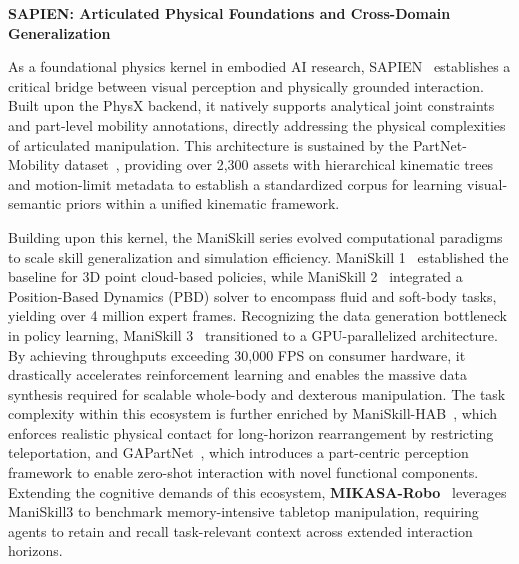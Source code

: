 \documentclass[acmsmall,screen,review,anonymous]{acmart}
\begin{document}
\textbf{SAPIEN\@: Articulated Physical Foundations and Cross-Domain Generalization}

As a foundational physics kernel in embodied AI research, SAPIEN~\cite{xiang2020sapien} establishes a critical bridge between visual perception and physically grounded interaction. 
Built upon the PhysX backend, it natively supports analytical joint constraints and part-level mobility annotations, directly addressing the physical complexities of articulated manipulation. 
This architecture is sustained by the PartNet-Mobility dataset~\cite{xiang2020sapien}, providing over 2,300 assets with hierarchical kinematic trees and motion-limit metadata to establish a standardized corpus for learning visual-semantic priors within a unified kinematic framework.

Building upon this kernel, the ManiSkill series evolved computational paradigms to scale skill generalization and simulation efficiency. ManiSkill 1~\cite{mu2021maniskill} established the baseline for 3D point cloud-based policies, while ManiSkill 2~\cite{gu2023maniskill2} integrated a Position-Based Dynamics (PBD) solver to encompass fluid and soft-body tasks, yielding over 4 million expert frames. Recognizing the data generation bottleneck in policy learning, ManiSkill 3~\cite{tao2025maniskill3} transitioned to a GPU-parallelized architecture. By achieving throughputs exceeding 30,000 FPS on consumer hardware, it drastically accelerates reinforcement learning and enables the massive data synthesis required for scalable whole-body and dexterous manipulation. The task complexity within this ecosystem is further enriched by ManiSkill-HAB~\cite{shukla2025maniskillhab}, which enforces realistic physical contact for long-horizon rearrangement by restricting teleportation, and GAPartNet~\cite{geng2023gapartnet}, which introduces a part-centric perception framework to enable zero-shot interaction with novel functional components. Extending the cognitive demands of this ecosystem, \textbf{MIKASA-Robo}~\cite{cherepanov2026mikasarobo} leverages ManiSkill3 to benchmark memory-intensive tabletop manipulation, requiring agents to retain and recall task-relevant context across extended interaction horizons.
\end{document}
